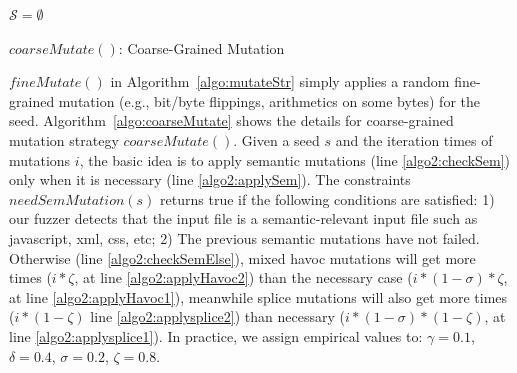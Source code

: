 \begin{algorithm}[t]
	\small	
	\BlankLine
	
	$\mathcal{S} = \emptyset$\;	
	\caption{$coarseMutate()$: Coarse-Grained Mutation}
	\label{algo:coarseMutate}
\end{algorithm}
 
$fineMutate()$ in  Algorithm~\ref{algo:mutateStr}  simply  applies a random fine-grained mutation (e.g., bit/byte flippings, arithmetics  on some bytes) for the seed. Algorithm~\ref{algo:coarseMutate} shows the details for coarse-grained mutation strategy  $coarseMutate()$. Given a seed $s$ and the iteration times of mutations $i$, the basic idea is to apply semantic mutations (line \ref{algo2:checkSem}) only  when it is  necessary (line \ref{algo2:applySem}). The constraints $needSemMutation(s)$ returns true if the following conditions are satisfied: 1) our fuzzer detects that the input file is  a semantic-relevant input file such as javascript, xml, css, etc; 2) The previous semantic mutations have not failed. Otherwise (line \ref{algo2:checkSemElse}), mixed havoc mutations will get more times ($i * \zeta$, at line \ref{algo2:applyHavoc2}) than the necessary case ($i * (1-\sigma) * \zeta$, at line \ref{algo2:applyHavoc1}), meanwhile splice mutations will also get more times ($ i * (1-\zeta)$ line \ref{algo2:applysplice2}) than necessary ($i * (1-\sigma) * (1-\zeta)$, at line \ref{algo2:applysplice1}).
In practice, we assign empirical values to: $\gamma=0.1$, $\delta=0.4$, $\sigma=0.2$, $\zeta=0.8$.




